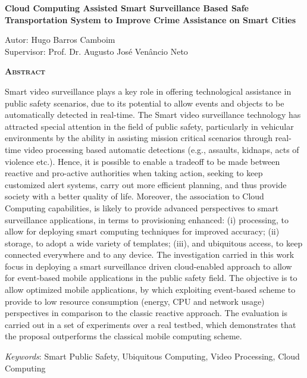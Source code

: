 \begin{center}
	{\Large{\textbf{Cloud Computing Assisted Smart Surveillance Based Safe Transportation System to Improve Crime Assistance on Smart Cities}}}
\end{center}

\vspace{0.5cm}

\begin{flushright}
	Autor: Hugo Barros Camboim\\
	Supervisor: Prof. Dr. Augusto José Venâncio Neto
\end{flushright}

\vspace{0.5cm}

\begin{center}
	\Large{\textsc{\textbf{Abstract}}}
\end{center}

\noindent Smart video surveillance plays a key role in offering technological assistance in public safety scenarios, due to its potential to allow events and objects to be automatically detected in real-time. The Smart video surveillance technology has attracted special attention in the field of public safety, particularly  in vehicular environments by the ability in assisting mission critical scenarios through real-time video processing based automatic detections (e.g., assaults, kidnaps, acts of violence etc.). Hence, it is possible to enable a tradeoff to be made between reactive and pro-active authorities when taking action, seeking to keep customized alert systems, carry out more efficient planning, and thus provide society with a better quality of life. Moreover, the association to Cloud Computing capabilities, is likely to provide advanced perspectives to smart surveillance applications, in terms to provisioning enhanced: (i) processing, to allow for deploying smart computing techniques for improved accuracy; (ii) storage, to adopt a wide variety of templates; (iii), and ubiquitous access, to keep connected everywhere and to any device. The investigation carried in this work focus in deploying a smart surveillance driven cloud-enabled approach to allow for event-based mobile applications in the public safety field. The objective is to allow optimized mobile applications, by which exploiting event-based scheme to provide to low resource consumption (energy, CPU and network usage) perspectives in comparison to the classic reactive approach. The evaluation is carried out in a set of experiments over a real testbed, which demonstrates that the proposal outperforms the classical mobile computing scheme. 

\noindent\textit{Keywords}: Smart Public Safety, Ubiquitous Computing, Video Processing, Cloud Computing